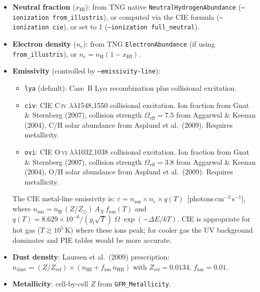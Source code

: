 \documentclass[english,a4paper]{my_memo}
\begin{document}
\begin{itemize}
\item \textbf{Neutral fraction} ($x_\mathrm{HI}$): from TNG native
  \texttt{NeutralHydrogenAbundance} (\texttt{--ionization from\_illustris}),
  or computed via the CIE formula (\texttt{--ionization cie}), or set
  to 1 (\texttt{--ionization full\_neutral}).

\item \textbf{Electron density} ($n_e$): from TNG
  \texttt{ElectronAbundance} (if using \texttt{from\_illustris}), or
  $n_e = n_\mathrm{H}(1 - x_\mathrm{HI})$.

\item \textbf{Emissivity} (controlled by \texttt{--emissivity-line}):
  \begin{itemize}
  \item \texttt{lya} (default): Case~B Ly$\alpha$ recombination plus
    collisional excitation.
  \item \texttt{civ}: CIE C\,\textsc{iv} $\lambda\lambda$1548,1550
    collisional excitation.  Ion fraction from Gnat \& Sternberg (2007),
    collision strength $\Omega_\mathrm{eff} = 7.5$ from Aggarwal \& Keenan
    (2004), C/H solar abundance from Asplund et al.\ (2009).
    Requires metallicity.
  \item \texttt{ovi}: CIE O\,\textsc{vi} $\lambda\lambda$1032,1038
    collisional excitation.  Ion fraction from Gnat \& Sternberg (2007),
    collision strength $\Omega_\mathrm{eff} = 3.8$ from Aggarwal \& Keenan
    (2004), O/H solar abundance from Asplund et al.\ (2009).
    Requires metallicity.
  \end{itemize}
  The CIE metal-line emissivity is:
  $\varepsilon = n_\mathrm{ion} \times n_e \times q(T)$
  \,[photons\,cm$^{-3}$\,s$^{-1}$],
  where $n_\mathrm{ion} = n_\mathrm{H}\,(Z/Z_\odot)\,A_X\,f_\mathrm{ion}(T)$
  and $q(T) = 8.629\times10^{-6}/(g_l\sqrt{T})\;\Omega\;\exp(-\Delta E/kT)$.
  CIE is appropriate for hot gas ($T \gtrsim 10^5$\,K) where these ions
  peak; for cooler gas the UV background dominates and PIE tables would
  be more accurate.

\item \textbf{Dust density}: Laursen et al.\ (2009) \cite{laursen2009}
  prescription: $n_\mathrm{dust} = (Z/Z_\mathrm{ref})\times
  (n_\mathrm{HI} + f_\mathrm{ion}\,n_\mathrm{HII})$
  with $Z_\mathrm{ref} = 0.0134$, $f_\mathrm{ion} = 0.01$.

\item \textbf{Metallicity}: cell-by-cell $Z$ from \texttt{GFM\_Metallicity}.
\end{itemize}
\end{document}
